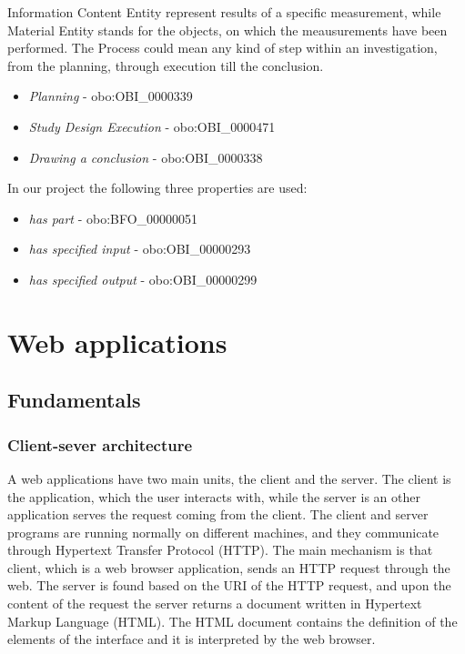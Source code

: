 Information Content Entity represent results of a specific measurement, while Material Entity stands for the objects, on which the meausurements have been performed. 
The Process could mean any kind of step within an investigation, from the planning, through execution till the conclusion.

\begin{itemize}
	\item  \textit{Planning} - obo:OBI\_0000339
	\item  \textit{Study Design Execution} - obo:OBI\_0000471
	\item  \textit{Drawing a conclusion} - obo:OBI\_0000338
\end{itemize}


In our project the following three properties are used:

\begin{itemize}
	\item  \textit{has part} - obo:BFO\_00000051
	\item  \textit{has specified input} - obo:OBI\_00000293
	\item  \textit{has specified output} - obo:OBI\_00000299
\end{itemize}


\section{Web applications}

\subsection{Fundamentals} \label{fundamentals}

\subsubsection{Client-sever architecture} \label{clientServer}

A web applications have two main units, the client and the server. The client is the application, which the user interacts with, while the server is an other application serves the request coming from the client. The client and server programs are running normally on different machines, and they communicate through Hypertext Transfer Protocol (HTTP). The main mechanism is that client, which is a web browser application, sends an HTTP request through the web. The server is found based on the URI of the HTTP request, and upon the content of the request the server returns a document written in Hypertext Markup Language (HTML). The HTML document contains the definition of the elements of the interface and it is interpreted by the web browser.

